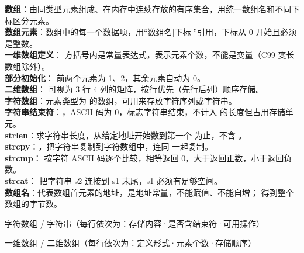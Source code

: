 \documentclass[a4paper,11pt]{article}
\begin{document}
\begin{keyterms}
\textbf{数组}：由同类型元素组成、在内存中连续存放的有序集合，用统一数组名和不同下标区分元素。\\
\textbf{数组元素}：数组中的每一个数据项，用“数组名[下标]”引用，下标从 0 开始且必须是整数。\\
\textbf{一维数组定义}： 方括号内是常量表达式，表示元素个数，不能是变量（C99 变长数组除外）。\\
\textbf{部分初始化}： 前两个元素为 1、2，其余元素自动为 0。\\
\textbf{二维数组}： 可视为 3 行 4 列的矩阵，按行优先（先行后列）顺序存储。\\
\textbf{字符数组}：元素类型为  的数组，可用来存放字符序列或字符串。\\
\textbf{字符串结束符}：，ASCII 码为 0，标志字符串结束，不计入  的长度但占用存储单元。\\
\textbf{strlen}：求字符串长度，从给定地址开始数到第一个  为止，不含 。\\
\textbf{strcpy}：，把字符串复制到字符数组中，连同  一起复制。\\
\textbf{strcmp}： 按字符 ASCII 码逐个比较，相等返回 0，大于返回正数，小于返回负数。\\
\textbf{strcat}： 把字符串 s2 连接到 s1 末尾，s1 必须有足够空间。\\
\textbf{数组名}：代表数组首元素的地址，是地址常量，不能赋值、不能自增； 得到整个数组的字节数。
\end{keyterms}

\begin{contrast}{字符数组 / 字符串（每行依次为：存储内容·是否含结束符·可用操作）}
\end{contrast}

\begin{contrast}{一维数组 / 二维数组（每行依次为：定义形式·元素个数·存储顺序）}
\end{contrast}
\end{document}
